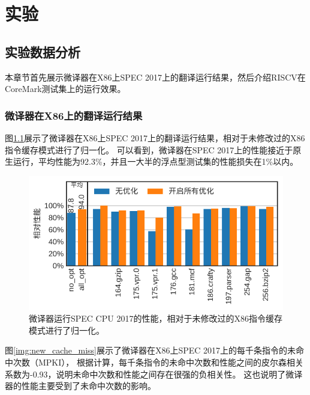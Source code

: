 \chapter{实验}\label{chap:Epxeriment}

\section{实验数据分析}

本章节首先展示微译器在X86上SPEC 2017上的翻译运行结果，然后介绍RISCV在CoreMark测试集上的运行效果。

\subsection{微译器在X86上的翻译运行结果}

图\ref{img:ucache_ipc}展示了微译器在X86上SPEC 2017上的翻译运行结果，相对于未修改过的X86指令缓存模式进行了归一化。
可以看到，微译器在SPEC 2017上的性能接近于原生运行，平均性能为92.3\%，并且一大半的浮点型测试集的性能损失在1\%以内。

\begin{figure}[h]
  \centering
  \includegraphics[width=1\linewidth]{./plot/ucache_ipc.pdf}
  \caption{微译器运行SPEC CPU 2017的性能，相对于未修改过的X86指令缓存模式进行了归一化。}
  \label{img:ucache_ipc}
\end{figure}

图\ref{img:new_cache_miss}展示了微译器在X86上SPEC 2017上的每千条指令的未命中次数（MPKI），
根据计算，每千条指令的未命中次数和性能之间的皮尔森相关系数为-0.93，说明未命中次数和性能之间存在很强的负相关性。
这也说明了微译器的性能主要受到了未命中次数的影响。

